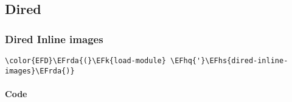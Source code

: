 \documentclass[a4wide,10pt]{article}
\newcommand{\EFk}[1]{\textcolor{EFk}{#1}} %
\newcommand{\EFhq}[1]{\textcolor{EFhq}{#1}} %
\newcommand{\EFhs}[1]{\textcolor{EFhs}{#1}} %
\newcommand{\EFrda}[1]{\textcolor{EFrda}{#1}} %
\begin{document}
\subsection{Dired}
\label{sec:org66d3bf8}
\subsubsection{Dired Inline images}
\label{sec:org1db3dd8}
\begin{Code}
\begin{Verbatim}
\color{EFD}\EFrda{(}\EFk{load-module} \EFhq{'}\EFhs{dired-inline-images}\EFrda{)}
\end{Verbatim}
\end{Code}
\paragraph{Code}
\label{sec:orgb5b4ba7}
\end{document}
